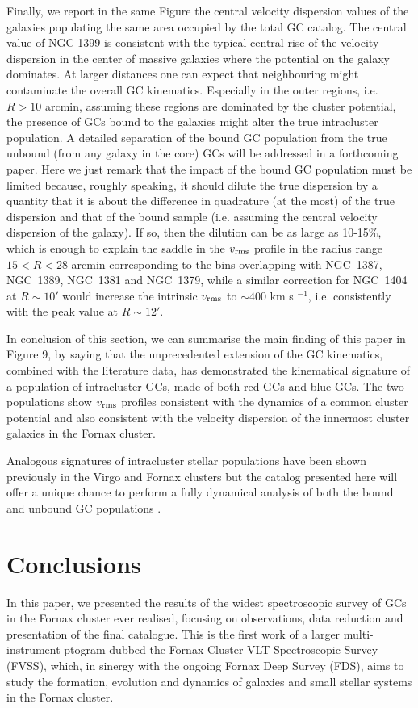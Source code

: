 \documentclass[useAMS,usenatbib]{mn2e}
\begin{document}
Finally, we report in the same Figure the central velocity dispersion values of the galaxies populating the same area occupied by the total GC catalog. The central value of NGC 1399 is consistent with the typical central rise of the velocity dispersion in the center of massive galaxies where the potential on the galaxy dominates. At larger distances one can expect that neighbouring might contaminate the overall GC kinematics. Especially in the outer regions, i.e. $R>10$ arcmin, assuming these regions are dominated by the cluster potential, the presence of GCs bound to the galaxies might alter the true  intracluster population. A detailed separation of the bound GC population from the true unbound (from any galaxy in the core) GCs will be addressed in a forthcoming paper. Here we just remark that the impact of the bound GC population must be limited because, roughly speaking, it should dilute the true dispersion by a quantity that it is about the difference in quadrature (at the most) of the true dispersion and that of the bound sample (i.e. assuming the central velocity dispersion of the galaxy). If so, then the dilution can be as large as 10-15$\%$, which is enough to explain the saddle in the  $v_{\rm rms}$ profile in the radius range $15<R<28$ arcmin corresponding to the bins overlapping with NGC~1387, NGC~1389, NGC~1381 and NGC~1379, while a similar correction for NGC~1404 at $R\sim10'$ would increase the intrinsic $v_{\rm rms}$ to $\sim400$ km s $^{-1}$, i.e. consistently with the peak value at $R\sim12'$.

In conclusion of this section, we can summarise the main finding of this paper in Figure 9, by saying that the unprecedented extension of the GC kinematics, combined with the literature data, has demonstrated the kinematical signature of a population of intracluster GCs, made of both red GCs and blue GCs. The two populations show $v_{\rm rms}$ profiles consistent with the dynamics of a common cluster potential and also consistent with the velocity dispersion of the innermost cluster galaxies in the Fornax cluster. 

Analogous signatures of intracluster stellar populations have been shown previously in the Virgo and Fornax clusters \citep[see e.g., ][]{Arnaboldi04, Longobardi15, Paolillo02} but the catalog presented here will offer a unique chance to perform a fully dynamical analysis of both the bound and unbound GC populations \citep{DAbrusco16}.

\section{Conclusions}
\label{sec:conclusions}
In this paper, we presented the results of the widest spectroscopic survey of GCs in the Fornax cluster ever realised, focusing on observations, data reduction and presentation of the final catalogue. This is the first work of a larger multi-instrument ptogram dubbed the Fornax Cluster VLT Spectroscopic Survey (FVSS), which, in sinergy with the ongoing Fornax Deep Survey (FDS), aims to study the formation, evolution and dynamics of galaxies and small stellar systems in the Fornax cluster.
\end{document}
